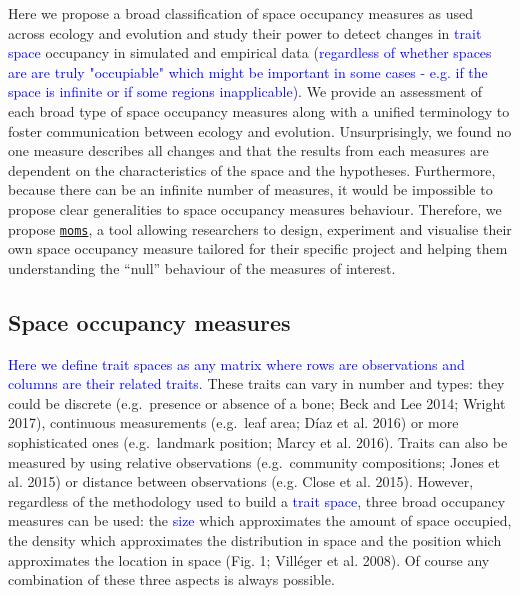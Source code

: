 \documentclass[]{article}
\begin{document}
Here we propose a broad classification of space occupancy measures as
used across ecology and evolution and study their power to detect
changes in \textcolor{blue}{trait space} occupancy in
simulated and empirical data
(\textcolor{blue}{regardless of whether spaces are are truly "occupiable" which might be important in some cases - e.g. if the space is infinite or if some regions inapplicable)}.
We provide an assessment of each broad type of space occupancy measures
along with a unified terminology to foster communication between ecology
and evolution. Unsurprisingly, we found no one measure describes all
changes and that the results from each measures are dependent on the
characteristics of the space and the hypotheses. Furthermore, because
there can be an infinite number of measures, it would be impossible to
propose clear generalities to space occupancy measures behaviour.
Therefore, we propose
\href{https://tguillerme.shinyapps.io/moms/}{\texttt{moms}}, a tool
allowing researchers to design, experiment and visualise their own space
occupancy measure tailored for their specific project and helping them
understanding the ``null'' behaviour of the measures of interest.

\subsection{Space occupancy measures}\label{space-occupancy-measures}

\textcolor{blue}{Here we define trait spaces as any matrix where rows are observations and columns are their related traits.}
These traits can vary in number and types: they could be discrete
(e.g.~presence or absence of a bone; Beck and Lee 2014; Wright 2017),
continuous measurements (e.g.~leaf area; Díaz et al. 2016) or more
sophisticated ones (e.g.~landmark position; Marcy et al. 2016). Traits
can also be measured by using relative observations (e.g.~community
compositions; Jones et al. 2015) or distance between observations (e.g.
Close et al. 2015). However, regardless of the methodology used to build
a \textcolor{blue}{trait space}, three broad occupancy
measures can be used: the \textcolor{blue}{size} which
approximates the amount of space occupied, the density which
approximates the distribution in space and the position which
approximates the location in space (Fig. 1; Villéger et al. 2008). Of
course any combination of these three aspects is always possible.

\renewcommand\baselinestretch{1}\selectfont
\end{document}
